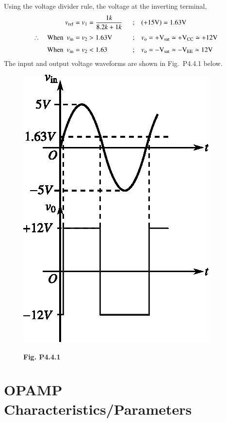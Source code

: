 \begin{solution}
Using the voltage divider rule, the voltage at the inverting terminal,
\begin{alignat*}{2}
 v_{\text{ref}} &=v_{1}=\frac{1k}{8.2 k +1k}~~ &;&\quad (+15\textrm{V})=1.63\textrm{V}\\[3pt]
\therefore\quad \text{When~ } v_{\text{in}} &= v_{2}>1.63\textrm{V} &;&\quad v_{\textrm{o}}=+\textrm{V}_{\text{sat}}\simeq +\textrm{V}_{\text{CC}}\simeq + 12\textrm{V}\\[3pt]
\text{When~ } v_{\text{in}} &=v_{2}<1.63 &;&\quad v_{\textrm{o}}=-\textrm{V}_{\text{sat}}\simeq -\textrm{V}_{\text{EE}}\simeq 12\textrm{V}
\end{alignat*}
The input and output voltage waveforms are shown in Fig.~P4.4.1 below.
\begin{figure}[H]
\centering
\includegraphics{chap4/figP4.4.1.eps}

\smallskip
{\bf Fig. P4.4.1}
\end{figure}
\end{solution}

\section{OPAMP Characteristics/Parameters}\label{sec4.3}


